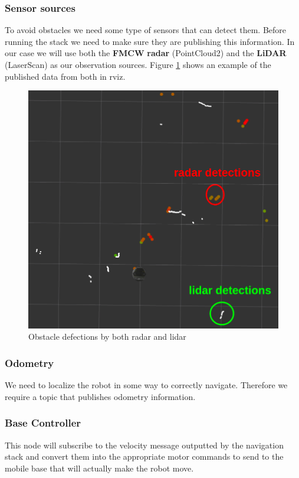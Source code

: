 \subsubsection{Sensor sources}
To avoid obstacles we need some type of sensors that can detect them. Before running the stack we need to make sure they are publishing this information.
In our case we will use both the \textbf{\ac{FMCW}} \textbf{\ac{radar}} (PointCloud2) and the \textbf{\ac{LiDAR}} (LaserScan) as our observation sources.
Figure \ref{fig:sensors} shows an example of the published data from both in rviz.
\begin{figure}[!htb]
    \centering
    \includegraphics[scale=0.5]{imgs/chapter3/sensors2.png}
    \caption{Obstacle defections by both radar and lidar}
    \label{fig:sensors}
\end{figure}
\subsubsection{Odometry}
We need to localize the robot in some way to correctly navigate. Therefore we require a topic that publishes odometry information.
\subsubsection{Base Controller}
This node will subscribe to the velocity message outputted by the navigation stack and convert them into the appropriate motor commands to send to the mobile base that will actually make the robot move.
